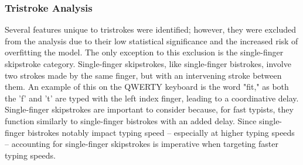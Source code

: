 \subsubsection{Tristroke Analysis}
\noindent Several features unique to tristrokes were identified; however, they were excluded from the analysis due to their low statistical significance and the increased risk of overfitting the model. The only exception to this exclusion is the single-finger skipstroke category. Single-finger skipstrokes, like single-finger bistrokes, involve two strokes made by the same finger, but with an intervening stroke between them. An example of this on the QWERTY keyboard is the word "fit," as both the 'f' and 't' are typed with the left index finger, leading to a coordinative delay. Single-finger skipstrokes are important to consider because, for fast typists, they function similarly to single-finger bistrokes with an added delay. Since single-finger bistrokes notably impact typing speed -- especially at higher typing speeds -- accounting for single-finger skipstrokes is imperative when targeting faster typing speeds.



